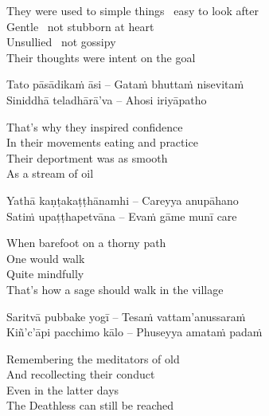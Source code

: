 \begin{english-verses}
  They were used to simple things \breathmark\ easy to look after\\
  Gentle \breathmark\ not stubborn at heart\\
  Unsullied \breathmark\ not gossipy\\
  Their thoughts were intent on the goal
\end{english-verses}

\begin{verses}
  Tato pāsādikaṁ āsi – Gataṁ bhuttaṁ nisevitaṁ\\
  Siniddhā teladhārā'va – Ahosi iriyāpatho
\end{verses}

\begin{english-verses}
  That's why they inspired confidence\\
  In their movements eating and practice\\
  Their deportment was as smooth\\
  As a stream of oil
\end{english-verses}

\begin{verses}
  Yathā kaṇṭakaṭṭhānamhi – Careyya anupāhano\\
  Satiṁ upaṭṭhapetvāna – Evaṁ gāme munī care
\end{verses}

\begin{english-verses}
  When barefoot on a thorny path\\
  One would walk\\
  Quite mindfully\\
  That's how a sage should walk in the village
\end{english-verses}

\begin{verses}
  Saritvā pubbake yogī – Tesaṁ vattam'anussaraṁ\\
  Kiñ'c'āpi pacchimo kālo – Phuseyya amataṁ padaṁ
\end{verses}

\begin{english-verses}
  Remembering the meditators of old\\
  And recollecting their conduct\\
  Even in the latter days\\
  The Deathless can still be reached
\end{english-verses}

\suttaRef{[Thag 16.10]}

